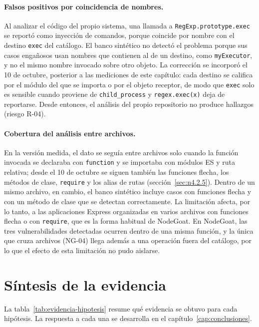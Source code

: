 \paragraph{Falsos positivos por coincidencia de nombres.} Al analizar el
código del propio sistema, una llamada a \texttt{RegExp.prototype.exec}
se reportó como inyección de comandos, porque coincide por nombre con el
destino \texttt{exec} del catálogo. El banco sintético no detectó el
problema porque sus casos engañosos usan nombres que contienen al de un
destino, como \texttt{myExecutor}, y no el mismo nombre invocado sobre
otro objeto. La corrección se incorporó el 10 de octubre, posterior a
las mediciones de este capítulo: cada destino se califica por el módulo
del que se importa o por el objeto receptor, de modo que \texttt{exec}
solo es sensible cuando proviene de \texttt{child\_process} y
\texttt{regex.exec(x)} deja de reportarse. Desde entonces, el análisis
del propio repositorio no produce hallazgos (riesgo R-04).

\paragraph{Cobertura del análisis entre archivos.} En la versión medida,
el dato se seguía entre archivos solo cuando la función invocada se
declaraba con \texttt{function} y se importaba con módulos ES y ruta
relativa; desde el 10 de octubre se siguen también las funciones flecha,
los métodos de clase, \texttt{require} y los alias de rutas
(sección~\ref{sec:n4.2.5}). Dentro de
un mismo archivo, en cambio, el banco sintético incluye casos con
funciones flecha y con un método de clase que se detectan correctamente.
La limitación afecta, por lo tanto, a las aplicaciones Express
organizadas en varios archivos con funciones flecha o con
\texttt{require}, que es la forma habitual de NodeGoat. En NodeGoat, las
tres vulnerabilidades detectadas ocurren dentro de una misma función, y
la única que cruza archivos (NG-04) llega además a una operación fuera
del catálogo, por lo que el efecto de esta limitación no pudo aislarse.

\section{Síntesis de la evidencia}\label{sec:sintesis-evidencia}

La tabla~\ref{tab:evidencia-hipotesis} resume qué evidencia se obtuvo
para cada hipótesis. La respuesta a cada una se desarrolla en el
capítulo~\ref{cap:conclusiones}.

